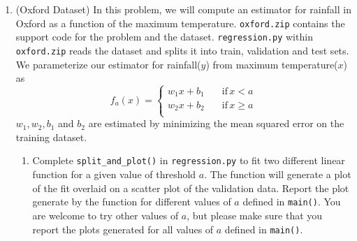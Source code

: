 \documentclass[12pt,twoside]{article}
\begin{document}
\begin{enumerate}
 \item (Oxford Dataset) In this problem, we will compute an estimator for rainfall in Oxford as a function of the maximum temperature. \verb|oxford.zip| contains the support code for the problem and the dataset. \verb|regression.py| within \verb|oxford.zip| reads the dataset and splits it into train, validation and test sets. We parameterize our estimator for rainfall($y$) from maximum temperature($x$) as 
  \begin{equation*}
f_a(x)=\begin{cases}
          w_1x + b_1 \quad &\text{if} \, x< a \\
         w_2x + b_2 &\text{if} \, x \geq a \\
     \end{cases}
 \end{equation*}
 $w_1, w_2, b_1$ and $b_2$ are estimated by minimizing the mean squared error on the training dataset. 
 \begin{enumerate}
 \item Complete \verb|split_and_plot()| in \verb|regression.py| to fit two different linear function for a given value of threshold $a$. The function will generate a plot of the fit overlaid on a scatter plot of the validation data. Report the plot generate by the function for different values of $a$ defined in \verb|main()|. You are welcome to try other values of $a$, but please make sure that you report the plots generated for all values of $a$ defined in \verb|main()|. 

 \medskip


\end{enumerate}
\end{enumerate}
\end{document}
